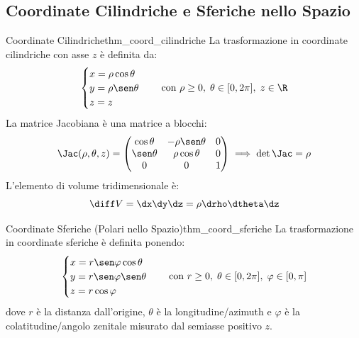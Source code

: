 \subsection{Coordinate Cilindriche e Sferiche nello Spazio}

\begin{teorema}{Coordinate Cilindriche}{thm_coord_cilindriche}
La trasformazione in coordinate cilindriche con asse $z$ è definita da:
\[
\begin{cases} x = \rho \cos\theta \\ y = \rho \sen\theta \\ z = z \end{cases} \quad \text{con } \rho \ge 0, \; \theta \in [0, 2\pi], \; z \in \R
\]
La matrice Jacobiana è una matrice a blocchi:
\[
\Jac(\rho, \theta, z) = \begin{pmatrix} \cos\theta & -\rho\sen\theta & 0 \\ \sen\theta & \rho\cos\theta & 0 \\ 0 & 0 & 1 \end{pmatrix} \implies \det \Jac = \rho
\]
L'elemento di volume tridimensionale è:
\[
\diff V = \dx\dy\dz = \rho \drho \dtheta \dz
\]
\end{teorema}

\begin{teorema}{Coordinate Sferiche (Polari nello Spazio)}{thm_coord_sferiche}
La trasformazione in coordinate sferiche è definita ponendo:
\[
\begin{cases} x = r \sen\varphi \cos\theta \\ y = r \sen\varphi \sen\theta \\ z = r \cos\varphi \end{cases} \quad \text{con } r \ge 0, \; \theta \in [0, 2\pi], \; \varphi \in [0, \pi]
\]
dove $r$ è la distanza dall'origine, $\theta$ è la longitudine/azimuth e $\varphi$ è la colatitudine/angolo zenitale misurato dal semiasse positivo $z$.
\end{teorema}

